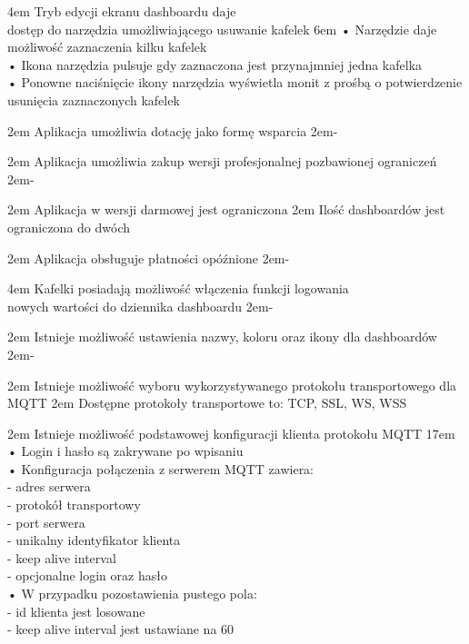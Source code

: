 {4em}{
    Tryb edycji ekranu dashboardu daje\\
    dostęp do narzędzia umożliwiającego usuwanie kafelek
}
{6em}{
    • Narzędzie daje możliwość zaznaczenia kilku kafelek\\
    • Ikona narzędzia pulsuje gdy zaznaczona jest przynajmniej jedna kafelka\\
    • Ponowne naciśnięcie ikony narzędzia wyświetla monit z prośbą o potwierdzenie\\
    \hspace*{0.5em} usunięcia zaznaczonych kafelek
}

{2em}{
    Aplikacja umożliwia dotację jako formę wsparcia
}
{2em}{-}

{2em}{
    Aplikacja umożliwia zakup wersji profesjonalnej pozbawionej ograniczeń
}
{2em}{-}

{2em}{
    Aplikacja w wersji darmowej jest ograniczona
}
{2em}{
    Ilość dashboardów jest ograniczona do dwóch
}

{2em}{
    Aplikacja obsługuje płatności opóźnione
}
{2em}{-}

{4em}{
    Kafelki posiadają możliwość włączenia funkcji logowania\\
    nowych wartości do dziennika dashboardu
}
{2em}{-}

{2em}{
    Istnieje możliwość ustawienia nazwy, koloru oraz ikony dla dashboardów
}
{2em}{-}

{2em}{
    Istnieje możliwość wyboru wykorzystywanego protokołu transportowego dla MQTT
}
{2em}{
    Dostępne protokoły transportowe to: TCP, SSL, WS, WSS
}

{2em}{
    Istnieje możliwość podstawowej konfiguracji klienta protokołu MQTT
}
{17em}{
    • Login i hasło są zakrywane po wpisaniu\\

    • Konfiguracja połączenia z serwerem MQTT zawiera:\\
    - adres serwera\\
    - protokół transportowy\\
    - port serwera\\
    - unikalny identyfikator klienta\\
    - keep alive interval\\
    - opcjonalne login oraz hasło\\

    • W przypadku pozostawienia pustego pola:\\
    - id klienta jest losowane\\
    - keep alive interval jest ustawiane na 60
}

